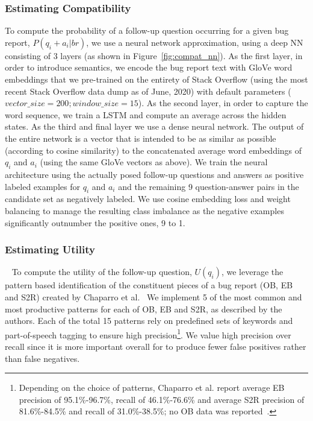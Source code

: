 \subsubsection{Estimating Compatibility}
To compute the probability of a follow-up question occurring for a given bug report, $P(q_{i}+a_{i}|br)$, we use a neural
network approximation, using a deep NN consisting of 3 layers (as shown in Figure~\ref{fig:compat_nn}). As the first layer,
in order to introduce semantics, we encode the bug report text with GloVe word embeddings that we pre-trained on the entirety of Stack Overflow (using the most recent Stack Overflow data dump as of June, 2020) with default parameters ($vector\_size = 200; window\_size = 15$). As the second layer, in order to capture the word sequence, we train a LSTM and compute an average across the hidden states. As the third and final layer we use a dense neural network. The output of the entire network is a vector that is intended to be as similar as possible (according to cosine similarity) to the concatenated average word embeddings of $q_{i}$ and $a_{i}$ (using the same GloVe vectors as above). We train the neural architecture using the actually posed follow-up questions and answers as positive labeled examples for $q_{i}$ and $a_{i}$ and the remaining 9 question-answer pairs in the candidate set as negatively labeled. We use cosine embedding loss and weight balancing to manage the resulting class imbalance as the negative examples significantly outnumber the positive ones, 9 to 1.

\subsubsection{Estimating Utility}~\label{sec:estimate_util}
To compute the utility of the follow-up question, $U(q_{i})$, we leverage the pattern based
identification of the constituent pieces of a bug report (OB, EB and S2R) created by Chaparro 
et al.~\cite{chaparro17detecting}
We implement 5 of the most common and most productive patterns for each of OB, EB and S2R, as described by
the authors. Each of the total 15 patterns rely on predefined sets of keywords and part-of-speech tagging to ensure high
precision\footnote{Depending on the choice of patterns, Chaparro et al. report average EB precision of 95.1\%-96.7\%, recall of 46.1\%-76.6\% and average S2R precision of 81.6\%-84.5\% and recall of 31.0\%-38.5\%; no OB data was reported~\cite{chaparro17detecting}.}. We value high precision over recall since it is more important overall for \evpi to produce fewer false positives rather than false negatives.

